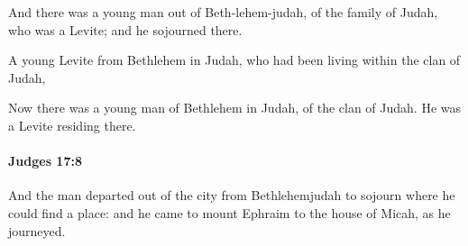 			\begin{versebox}
					\item[BHS] 
					\item[ASV] And there was a young man out of Beth-lehem-judah, of the family of Judah, who was a Levite; and he sojourned there.
					\item[NIV] A young Levite from Bethlehem in Judah, who had been living within the clan of Judah,
					\item[NRSV] Now there was a young man of Bethlehem in Judah, of the clan of Judah. He was a Levite residing there.
			\end{versebox}

		\paragraph{Judges 17:8} %
			\label{JUDGES-17-8}

			And the man departed out of the city from Bethlehemjudah to sojourn where he could find a place: and he came to mount Ephraim to the house of Micah, as he journeyed.


